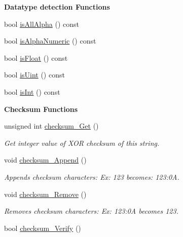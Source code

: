 \begin{Indent}{\bf Datatype detection Functions}\par
\begin{DoxyCompactItemize}
\item 
bool \hyperlink{classstr_af4939953c030003d88db9c991424b47d}{is\+All\+Alpha} () const 
\item 
bool \hyperlink{classstr_a97bac98da801725f3055a707416ed98c}{is\+Alpha\+Numeric} () const 
\item 
bool \hyperlink{classstr_a4a4e93eecb99b759d88e90b5b8958524}{is\+Float} () const 
\item 
bool \hyperlink{classstr_aa20e849f31941d57bd5494e0171c9b2a}{is\+Uint} () const 
\item 
bool \hyperlink{classstr_ab56b8a487e9663f82d282e95b8c00d3d}{is\+Int} () const 
\end{DoxyCompactItemize}
\end{Indent}
\begin{Indent}{\bf Checksum Functions}\par
\begin{DoxyCompactItemize}
\item 
unsigned int \hyperlink{classstr_a797e6118facc1bb02c6be9f09afe7b52}{checksum\+\_\+\+Get} ()
\begin{DoxyCompactList}\small\item\em Get integer value of X\+OR checksum of this string. \end{DoxyCompactList}\item 
void \hyperlink{classstr_a1c3a9c9effc83194206f9de663e613ba}{checksum\+\_\+\+Append} ()
\begin{DoxyCompactList}\small\item\em Appends checksum characters\+: Ex\+: 123 becomes\+: 123\+:0A. \end{DoxyCompactList}\item 
void \hyperlink{classstr_a4e2318050adba9b81eb5381ffddafe62}{checksum\+\_\+\+Remove} ()
\begin{DoxyCompactList}\small\item\em Removes checksum characters\+: Ex\+: 123\+:0A becomes 123. \end{DoxyCompactList}\item 
bool \hyperlink{classstr_a3c7621dda5120c1f808fd809676b5cd6}{checksum\+\_\+\+Verify} ()
\end{DoxyCompactItemize}
\end{Indent}
